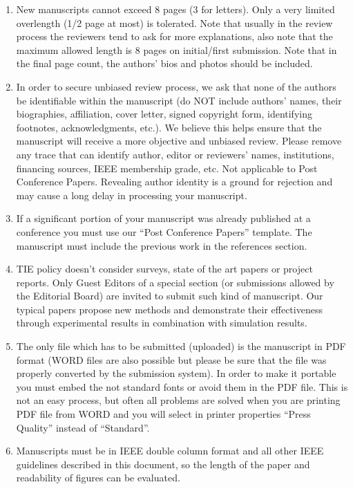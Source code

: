 \documentclass[journal]{IEEEtranTIE}
\begin{document}
\begin{enumerate}[1)]
	\item New manuscripts cannot exceed 8 pages (3 for letters). Only a very limited overlength (1/2 page at most) is tolerated. Note that usually in the review process the reviewers tend to ask for more explanations, also note that the maximum allowed length is 8 pages on initial/first submission.  Note that in the final page count, the authors' bios and photos should be included.
	\item In order to secure unbiased review process, we ask that none of the authors be identifiable within the manuscript (do NOT include authors' names, their biographies, affiliation, cover letter, signed copyright form, identifying footnotes, acknowledgments, etc.). We believe this helps ensure that the manuscript will receive a more objective and unbiased review. Please remove any trace that can identify author, editor or reviewers' names, institutions, financing sources, IEEE membership grade, etc. Not applicable to Post Conference Papers. Revealing author identity is a ground for rejection and may cause a long delay in processing your manuscript.
	\item If a significant portion of your manuscript was already published at a conference you must use our ``Post Conference Papers'' template. The manuscript must include the previous work in the references section.
	\item TIE policy doesn't consider surveys, state of the art papers or project reports. Only Guest Editors of a special section (or submissions allowed by the Editorial Board) are invited to submit such kind of manuscript. Our typical papers propose new methods and demonstrate their effectiveness through experimental results in combination with simulation results.
	\item The only file which has to be submitted (uploaded) is the manuscript in PDF format (WORD files are also possible but please be sure that the file was properly converted by the submission system). In order to make it portable you must embed the not standard fonts or avoid them in the PDF file. This is not an easy process, but often all problems are solved when you are printing PDF file from WORD and you will select in printer properties  ``Press Quality'' instead of ``Standard''.
	\item Manuscripts must be in IEEE double column format and all other IEEE guidelines described in this document, so the length of the paper and readability of figures can be evaluated.

\end{enumerate}
\end{document}
